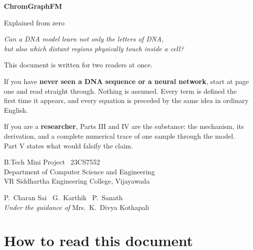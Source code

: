 \documentclass[11pt,a4paper]{article}
\begin{document}
\begin{titlepage}
\centering
\vspace*{2.2cm}

{\Huge\bfseries\color{deepblue} ChromGraphFM}

\vspace{0.5cm}
{\LARGE Explained from zero}

\vspace{0.9cm}
{\large\itshape Can a DNA model learn not only the letters of DNA,\\
but also which distant regions physically touch inside a cell?}

\vspace{1.6cm}
\begin{tcolorbox}[width=0.86\textwidth, colback=softgrey, colframe=inkgrey,
                  boxrule=0.4pt, arc=3pt, left=14pt, right=14pt]
\small
This document is written for two readers at once.

\smallskip
If you have \textbf{never seen a DNA sequence or a neural network}, start at
page one and read straight through. Nothing is assumed. Every term is defined
the first time it appears, and every equation is preceded by the same idea in
ordinary English.

\smallskip
If you are a \textbf{researcher}, Parts III and IV are the substance: the
mechanism, its derivation, and a complete numerical trace of one sample through
the model. Part V states what would falsify the claim.
\end{tcolorbox}

\vfill
{\small
B.Tech Mini Project \textbullet\ 23CS7552\\
Department of Computer Science and Engineering\\
VR Siddhartha Engineering College, Vijayawada

\medskip
P.~Charan Sai \textbullet\ G.~Karthik \textbullet\ P.~Sanath\\
\emph{Under the guidance of} Mrs.~K.~Divya Kothapali
}
\end{titlepage}

\setcounter{tocdepth}{1}
\tableofcontents
\newpage

\section*{How to read this document}
\end{document}
